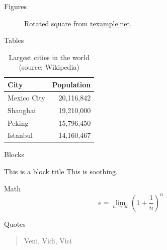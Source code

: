 \documentclass[10pt, compress]{beamer}
\begin{document}
\begin{frame}{Figures}
  \begin{figure}
    \setcounter{density}{20}
    \caption{Rotated square from
    \href{http://www.texample.net/tikz/examples/rotated-polygons/}{texample.net}.}
  \end{figure}
\end{frame}
\begin{frame}{Tables}
  \begin{table}
    \caption{Largest cities in the world (source: Wikipedia)}
    \begin{tabular}{lr}
      \toprule
      City & Population\\
      \midrule
      Mexico City & 20,116,842\\
      Shanghai & 19,210,000\\
      Peking & 15,796,450\\
      Istanbul & 14,160,467\\
      \bottomrule
    \end{tabular}
  \end{table}
\end{frame}
\begin{frame}{Blocks}

  \begin{block}{This is a block title}
    This is soothing.
  \end{block}

\end{frame}
\begin{frame}{Math}
  \begin{equation*}
    e = \lim_{n\to \infty} \left(1 + \frac{1}{n}\right)^n
  \end{equation*}
\end{frame}
\begin{frame}{Quotes}
  \begin{quote}
    Veni, Vidi, Vici
  \end{quote}
\end{frame}
\end{document}
